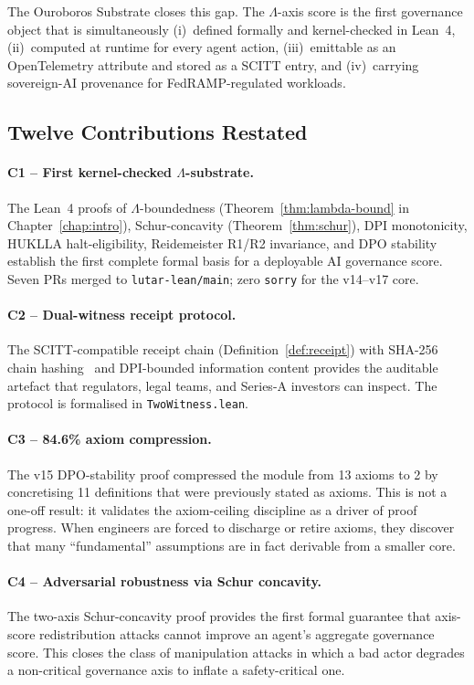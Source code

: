 \medskip

The Ouroboros Substrate closes this gap.
The \(\Lambda\)-axis score is the first governance object that is
simultaneously (i)~defined formally and kernel-checked in Lean~4,
(ii)~computed at runtime for every agent action, (iii)~emittable as an
OpenTelemetry attribute and stored as a SCITT entry, and (iv)~carrying
sovereign-AI provenance for FedRAMP-regulated workloads.

\subsection{Twelve Contributions Restated}

\paragraph{C1 -- First kernel-checked \(\Lambda\)-substrate.}
The Lean~4 proofs of \(\Lambda\)-boundedness (Theorem~\ref{thm:lambda-bound}
in Chapter~\ref{chap:intro}), Schur-concavity
(Theorem~\ref{thm:schur}), DPI monotonicity, HUKLLA halt-eligibility,
Reidemeister R1/R2 invariance, and DPO stability establish the first
complete formal basis for a deployable AI governance score.
Seven PRs merged to \texttt{lutar-lean/main}; zero \texttt{sorry} for the
v14--v17 core.

\paragraph{C2 -- Dual-witness receipt protocol.}
The SCITT-compatible receipt chain (Definition~\ref{def:receipt}) with
SHA-256 chain hashing~\cite{nist2012sha} and DPI-bounded information
content provides the auditable artefact that regulators, legal teams, and
Series-A investors can inspect.
The protocol is formalised in \texttt{TwoWitness.lean}.

\paragraph{C3 -- 84.6\% axiom compression.}
The v15 DPO-stability proof compressed the module from 13 axioms to 2
by concretising 11 definitions that were previously stated as axioms.
This is not a one-off result: it validates the axiom-ceiling discipline
as a driver of proof progress.
When engineers are forced to discharge or retire axioms, they discover
that many ``fundamental'' assumptions are in fact derivable from a smaller
core.

\paragraph{C4 -- Adversarial robustness via Schur concavity.}
The two-axis Schur-concavity proof provides the first formal guarantee
that axis-score redistribution attacks cannot improve an agent's aggregate
governance score.
This closes the class of manipulation attacks in which a bad actor
degrades a non-critical governance axis to inflate a safety-critical one.

